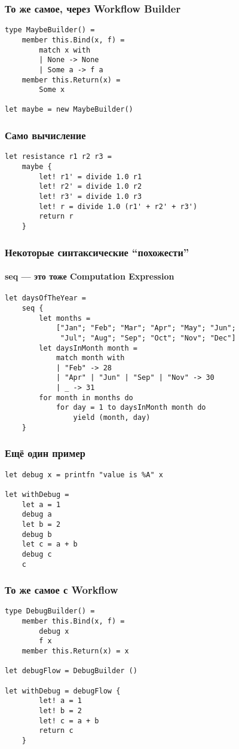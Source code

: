 \documentclass[xetex,mathserif,serif]{beamer}
\begin{document}
    \begin{frame}[fragile]
        \frametitle{То же самое, через Workflow Builder}
        \begin{verbatim}
type MaybeBuilder() =
    member this.Bind(x, f) = 
        match x with
        | None -> None
        | Some a -> f a
    member this.Return(x) = 
        Some x
   
let maybe = new MaybeBuilder()
        \end{verbatim}
    \end{frame}

    \begin{frame}[fragile]
        \frametitle{Само вычисление}
        \begin{verbatim}
let resistance r1 r2 r3 = 
    maybe {
        let! r1' = divide 1.0 r1
        let! r2' = divide 1.0 r2
        let! r3' = divide 1.0 r3
        let! r = divide 1.0 (r1' + r2' + r3')
        return r
    }
        \end{verbatim}
    \end{frame}

    \begin{frame}[fragile]
        \frametitle{Некоторые синтаксические ``похожести''}
        \framesubtitle{seq --- это тоже Computation Expression}
        \begin{verbatim}
let daysOfTheYear =
    seq {
        let months =
            ["Jan"; "Feb"; "Mar"; "Apr"; "May"; "Jun";
             "Jul"; "Aug"; "Sep"; "Oct"; "Nov"; "Dec"]
        let daysInMonth month =
            match month with
            | "Feb" -> 28
            | "Apr" | "Jun" | "Sep" | "Nov" -> 30
            | _ -> 31
        for month in months do
            for day = 1 to daysInMonth month do
                yield (month, day)
    }
        \end{verbatim}
    \end{frame}

    \begin{frame}[fragile]
        \frametitle{Ещё один пример}
        \begin{verbatim}
let debug x = printfn "value is %A" x

let withDebug = 
    let a = 1
    debug a
    let b = 2
    debug b
    let c = a + b
    debug c
    c
        \end{verbatim}
    \end{frame}

    \begin{frame}[fragile]
        \frametitle{То же самое с Workflow}
        \begin{verbatim}
type DebugBuilder() =
    member this.Bind(x, f) = 
        debug x 
        f x
    member this.Return(x) = x

let debugFlow = DebugBuilder ()

let withDebug = debugFlow {
        let! a = 1
        let! b = 2
        let! c = a + b
        return c
    }
        \end{verbatim}
    \end{frame}
\end{document}
